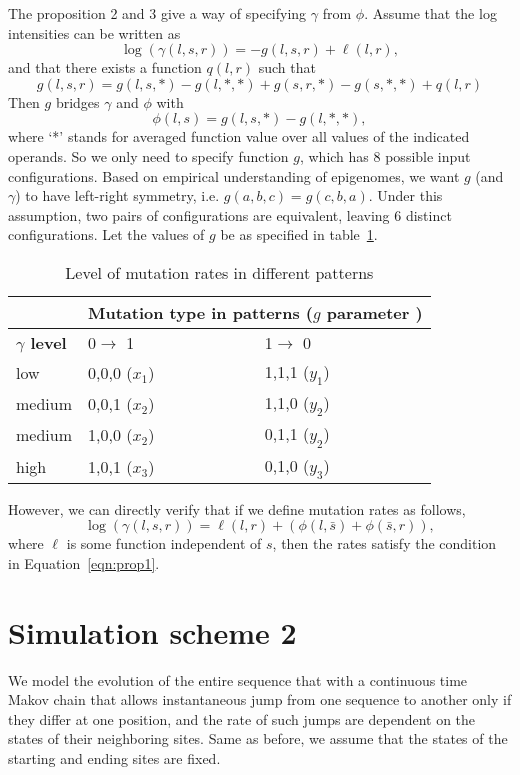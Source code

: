 \documentclass[11pt]{article}
\begin{document}
The proposition 2 and 3 give a way of specifying $\gamma$ from $\phi$.
Assume that the log intensities can be written as
\[
  \log(\gamma(l, s, r)) = -g(l, s, r) + \ell(l, r),
\]
and that there exists a function $q(l, r)$ such that
\[
g(l, s, r) = g(l, s, *) - g(l, *, *) + g(s, r, *) -g(s, *, *) + q(l, r)
\]
Then $g$ bridges $\gamma$ and $\phi$ with
\[
\phi(l, s) = g(l, s, *) - g(l, *, *),
\]
where `*' stands for averaged function value over all values of the
indicated operands. So we only need to specify function $g$, which has
8 possible input configurations. Based on empirical understanding of
epigenomes, we want $g$ (and $\gamma$) to have left-right symmetry,
i.e. $g(a, b, c) = g(c, b, a)$. Under this assumption, two pairs of
configurations are equivalent, leaving 6 distinct configurations. Let
the values of $g$ be as specified in table~\ref{tab:level}.
\begin{table}[t!]
  \centering
  \begin{tabular}{|p{4cm}|p{4cm}|p{4cm}|}\hline
     & \multicolumn{2}{|c|}{\textbf{Mutation type in patterns ($g$ parameter )}} \\\hline
    \textbf{$\gamma$ level} & 0$\rightarrow$ 1& 1$\rightarrow$ 0 \\\hline
    low & 0,0,0 ($x_1$)& 1,1,1 ($y_1$) \\\hline
    medium & 0,0,1 ($x_2$) & 1,1,0 ($y_2$) \\\hline
    medium & 1,0,0 ($x_2$)& 0,1,1 ($y_2$)\\\hline
    high & 1,0,1 ($x_3$)& 0,1,0 ($y_3$) \\\hline    
  \end{tabular}
  \caption{Level of mutation rates in different patterns}
  \label{tab:level}
\end{table}

However, we can directly verify that if we define mutation rates as follows,
\begin{equation}
\log (\gamma(l, s, r)) =  \ell(l, r) + (\phi(l, \bar{s}) +\phi(\bar{s}, r)),
\end{equation}
where $\ell$ is some function independent of $s$, then the rates
satisfy the condition in Equation~\ref{eqn:prop1}. 

\section{Simulation scheme 2}
We model the evolution of the entire sequence that with a
continuous time Makov chain that allows instantaneous jump from one
sequence to another only if they differ at one position, and the rate
of such jumps are dependent on the states of their neighboring
sites. Same as before, we assume that the states of the starting and
ending sites are fixed.
\end{document}
